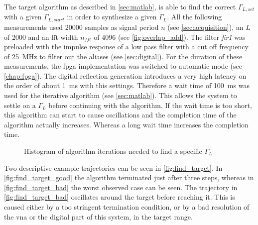 \documentclass[12pt,a4paper,parskip=full,abstract=true,BCOR=12mm,twoside,open=right]{scrreprt}
\def\device#1{\textit{#1}}
\begin{document}
The target algorithm as described in \cref{sec:matlab}, is able to find the
correct $\Gamma_{L,set}$ with a given $\Gamma_{L,start}$ in order to synthesize
a given $\Gamma_L$. All the following measurements used 20000 samples as
signal period $n$ (see \cref{sec:acquisition}), an $L$ of 2000 and an \gls{fft} width $n_{fft}$
of 4096 (see \cref{fig:overlap_add}). The filter \device{fir1} was preloaded with the
impulse response of a low pass filter with a cut off frequency of \SI{25}{\mega\hertz} to
filter out the aliases (see \cref{sec:digital}). For the duration of these measurements,
the \gls{fpga} implementation was switched to automatic mode (see \cref{chap:fpga}). The digital reflection generation introduces
a very high latency on the order of about \SI{1}{\milli\second} with this settings.
Therefore a wait time of \SI{100}{\milli\second} was used for the iterative algorithm
(see \cref{sec:matlab}). This allows the system to settle on a $\Gamma_L$ before continuing
with the algorithm. If the wait time is too short, this algorithm can start to
cause oscillations and the completion time of the algorithm actually increases. Whereas
a long wait time increases the completion time.

\begin{figure}[htb]
    \centering
    \caption{Histogram of algorithm iterations needed to find a specific $\Gamma_L$}
    \label{fig:iteration_hist}
\end{figure}

Two descriptive example trajectories can be seen in \cref{fig:find_target}. In
\cref{fig:find_target_good} the algorithm terminated just after three steps,
whereas in \cref{fig:find_target_bad} the worst observed case can be seen. The
trajectory in \cref{fig:find_target_bad} oscillates around the target before
reaching it. This is caused either by a too stringent termination condition, or
by a bad resolution of the \gls{vna} or the digital part of this system, in the
target range.
\end{document}
